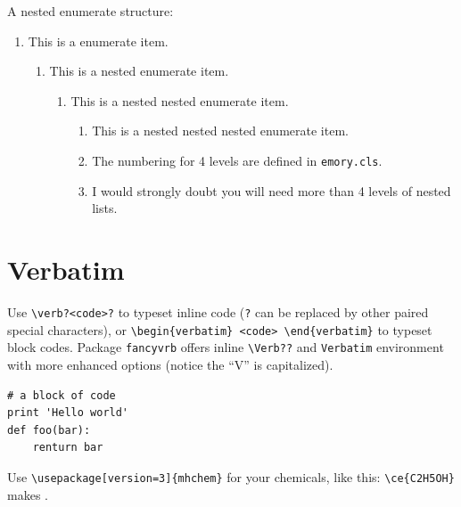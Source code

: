 \documentclass[draft, twoside]{emory}
\begin{document}
A nested enumerate structure:
\begin{enumerate}
  \item This is a enumerate item.
  \begin{enumerate}
    \item This is a nested enumerate item.
    \begin{enumerate}
      \item This is a nested nested enumerate item.
      \begin{enumerate}
        \item This is a nested nested nested enumerate item. 
        \item The numbering for 4 levels are defined in \Verb|emory.cls|.
        \item I would strongly doubt you will need more than 4 levels of nested lists.
      \end{enumerate}
    \end{enumerate}
  \end{enumerate}    
\end{enumerate}

\section{Verbatim}

Use \Verb|\verb?<code>?| to typeset inline code  (\Verb|?| can be replaced by
other paired special characters),
or  \Verb|\begin{verbatim} <code> \end{verbatim}| to typeset block codes.
Package \Verb|fancyvrb| offers inline \Verb|\Verb??| and \Verb|Verbatim| environment with more enhanced
options (notice the ``V'' is capitalized).

\begin{Verbatim}
# a block of code
print 'Hello world'
def foo(bar):
    renturn bar
\end{Verbatim}


Use \Verb|\usepackage[version=3]{mhchem}| for your chemicals, like this:
\Verb|\ce{C2H5OH}| makes .
\end{document}
